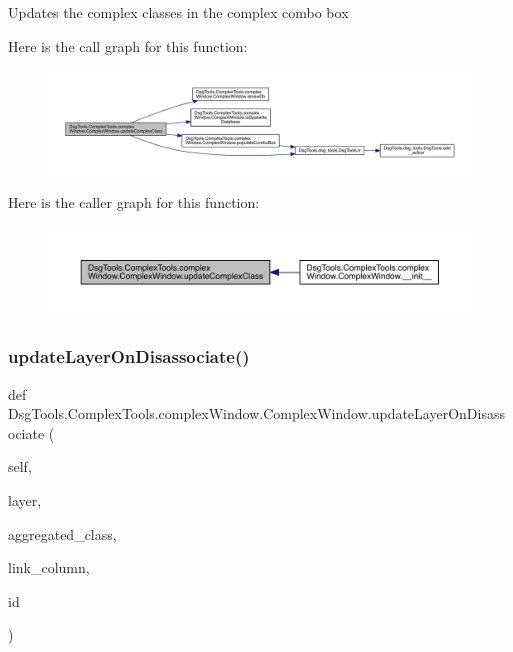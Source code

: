 \begin{DoxyVerb}Updates the complex classes in the complex combo box
\end{DoxyVerb}
 Here is the call graph for this function\+:
\nopagebreak
\begin{figure}[H]
\begin{center}
\leavevmode
\includegraphics[width=350pt]{class_dsg_tools_1_1_complex_tools_1_1complex_window_1_1_complex_window_adae9aafc227935f7b346b95d2f8560fa_cgraph}
\end{center}
\end{figure}
Here is the caller graph for this function\+:
\nopagebreak
\begin{figure}[H]
\begin{center}
\leavevmode
\includegraphics[width=350pt]{class_dsg_tools_1_1_complex_tools_1_1complex_window_1_1_complex_window_adae9aafc227935f7b346b95d2f8560fa_icgraph}
\end{center}
\end{figure}
\mbox{\label{class_dsg_tools_1_1_complex_tools_1_1complex_window_1_1_complex_window_a20403af8761555d878ff79ee16a398eb}} 
\subsubsection{\texorpdfstring{update\+Layer\+On\+Disassociate()}{updateLayerOnDisassociate()}}
{\footnotesize\ttfamily def Dsg\+Tools.\+Complex\+Tools.\+complex\+Window.\+Complex\+Window.\+update\+Layer\+On\+Disassociate (\begin{DoxyParamCaption}\item[{}]{self,  }\item[{}]{layer,  }\item[{}]{aggregated\+\_\+class,  }\item[{}]{link\+\_\+column,  }\item[{}]{id }\end{DoxyParamCaption})}

